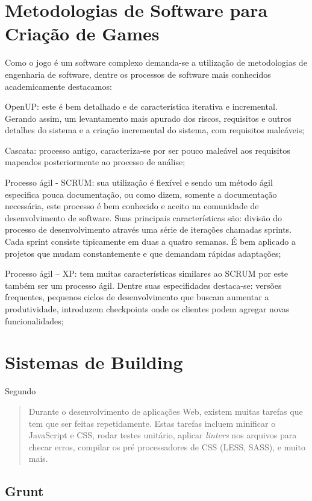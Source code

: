 \chapter{Metodologias de Software para Criação de Games}

Como o jogo é um software complexo demanda-se a utilização de
metodologias de engenharia de software, dentre os processos de software
mais conhecidos academicamente destacamos:

OpenUP: este é bem detalhado e de característica iterativa e
incremental. Gerando assim, um levantamento mais apurado dos riscos,
requisitos e outros detalhes do sistema e a criação incremental do
sistema, com requisitos maleáveis;

Cascata: processo antigo, caracteriza-se por ser pouco maleável aos
requisitos mapeados posteriormente ao processo de análise;

Processo ágil - SCRUM: sua utilização é flexível e sendo
um método ágil especifica pouca documentação, ou como dizem,
somente a documentação necessária, este processo é bem conhecido e
aceito na comunidade de desenvolvimento de software. Suas principais
características são: divisão do processo de desenvolvimento através
uma série de iterações chamadas sprints. Cada sprint consiste
tipicamente em duas a quatro semanas. É bem aplicado a projetos que
mudam constantemente e que demandam rápidas adaptações;

Processo ágil – XP: tem muitas características similares ao SCRUM
por este também ser um processo ágil. Dentre suas especifidades
destaca-se: versões frequentes, pequenos ciclos de desenvolvimento que
buscam aumentar a produtividade, introduzem checkpoints onde os clientes
podem agregar novas funcionalidades;

\chapter{Sistemas de Building}

Segundo \citet{gruntTutorial}
\begin{quote}
Durante o desenvolvimento de aplicações Web, existem muitas tarefas
que tem que ser feitas repetidamente. Estas tarefas incluem minificar o
JavaScript e CSS, rodar testes unitário, aplicar \textit{linters} nos arquivos
para checar erros, compilar os pré processadores de CSS (LESS, SASS), e
muito mais.
\end{quote}

\section{Grunt}

